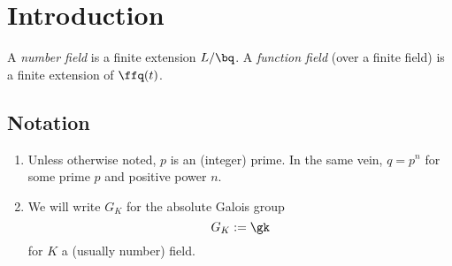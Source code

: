 \chapter*{Introduction}

A \textit{number field} is a finite extension $L/\bq$. A \textit{function field} (over a finite field) is a finite extension of $\ffq(t)$.

\section*{Notation}
\begin{enumerate}
\item Unless otherwise noted, $p$ is an (integer) prime. In the same vein, $q=
  p^n$ for some prime $p$ and positive power $n$.
\item We will write $G_K$ for the absolute Galois group
  \[ G_K := \gk \]
  for $K$ a (usually number) field.
\end{enumerate}
